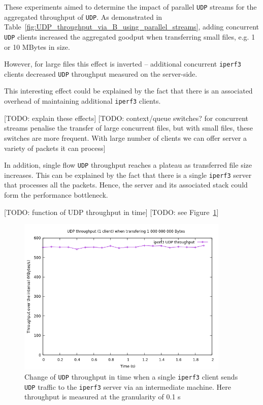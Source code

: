 \documentclass[12pt,a4paper,twoside,openright]{report}
\begin{document}
These experiments aimed to determine the impact of parallel \texttt{UDP} streams for the aggregated throughput of \texttt{UDP}.
As demonstrated in Table~\ref{fig:UDP_throughput_via_B_using_parallel_streams}, adding concurrent \texttt{UDP} clients increased the aggregated goodput when transferring small files, e.g. 1 or 10 MBytes in size.

However, for large files this effect is inverted -- additional concurrent \texttt{iperf3} clients decreased \texttt{UDP} throughput measured on the server-side.

This interesting effect could be explained by the fact that there is an associated overhead of maintaining additional \texttt{iperf3} clients.

[TODO: explain these effects]
[TODO: context/queue switches? for concurrent streams penalise the transfer of large concurrent files, but with small files, these switches are more frequent.
With large number of clients we can offer server a variety of packets it can process]

In addition, single flow \texttt{UDP} throughput reaches a plateau as transferred file size increases.
This can be explained by the fact that there is a single \texttt{iperf3} server that processes all the packets.
Hence, the server and its associated stack could form the performance bottleneck.


[TODO: function of UDP throughput in time]
[TODO: see Figure~\ref{fig:UDP_throughput_in_time}]
    \begin{figure}[H]
    \centering
    \includegraphics[width=0.9\textwidth]{figs/UDP_throughput_in_time.png}
    \caption[Change of \texttt{UDP} throughput in time when a single \texttt{iperf3} client sends \texttt{UDP} traffic to the \texttt{iperf3} server via an intermediate machine]{Change of \texttt{UDP} throughput in time when a single \texttt{iperf3} client sends \texttt{UDP} traffic to the \texttt{iperf3} server via an intermediate machine. Here throughput is measured at the granularity of 0.1 s}
    \label{fig:UDP_throughput_in_time}
    \end{figure}
\end{document}

